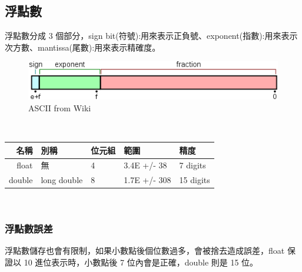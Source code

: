 \subsection{浮點數}
浮點數分成 3 個部分，sign bit(符號):用來表示正負號、exponent(指數):用來表示次方數、mantissa(尾數):用來表示精確度。\\
\begin{figure}
  \includegraphics[]{Type/IEEE754.png}
  \caption{ASCII from Wiki}
  \label{fig:IEEE754}
\end{figure}\\
\begin{tabular}{|r|l|l|l|l|} \hline 名稱 & 別稱 & 位元組 & 範圍 & 精度 \\\hline float & 無 & 4 & 3.4E +/- 38 & 7 digits \\\hline double & long double & 8 & 	1.7E +/- 308 & 15 digits \\\hline \end{tabular}\\
\subsubsection{浮點數誤差}
浮點數儲存也會有限制，如果小數點後個位數過多，會被捨去造成誤差，float 保證以 10 進位表示時，小數點後 7 位內會是正確，double 則是 15 位。

